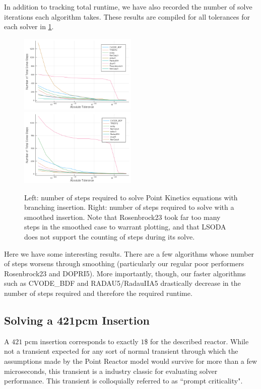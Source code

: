 \documentclass[review,onefignum,onetabnum]{siamart171218}
\begin{document}
In addition to tracking total runtime, we have also recorded the number of solve
iterations each algorithm takes. These results are compiled for all tolerances for
each solver in \cref{fig:num-steps}. \\

\begin{figure}[htb]
  \includegraphics[width=0.5\textwidth]{../plots/step-plots/stepinsert.png}
  \includegraphics[width=0.5\textwidth]{../plots/step-plots/tanhinserts.png}
  \caption{Left: number of steps required to solve Point Kinetics equations with
  branching insertion. Right: number of steps required to solve with a smoothed
  insertion. Note that Rosenbrock23 took far too many steps in the smoothed case
  to warrant plotting, and that LSODA does not support the counting of steps during
  its solve.}
  \label{fig:num-steps}
\end{figure}

Here we have some interesting results. There are a few algorithms whose number of
steps worsens through smoothing (particularly our regular poor performers Rosenbrock23
and DOPRI5). More importantly, though, our faster algorithms such as CVODE\_BDF and
RADAU5/RadauIIA5 drastically decrease in the number of steps required and therefore
the required runtime.

\subsection{Solving a 421pcm Insertion}
A $421$ pcm insertion corresponds to exactly $1$\$ for the described reactor.
While not a transient expected for any sort of normal transient through which the
assumptions made by the Point Reactor model would survive for more than a few microseconds,
this transient is a industry classic for evaluating solver performance. This transient
is colloquially referred to as ``prompt criticality".
\end{document}

